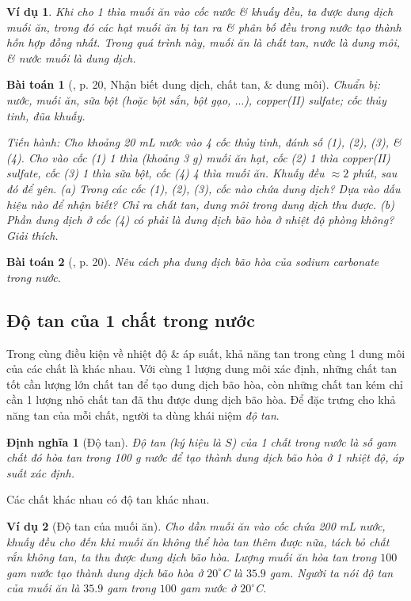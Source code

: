 \documentclass{article}
\newtheorem{baitoan}{Bài toán}
\newtheorem{dinhnghia}{Định nghĩa}
\newtheorem{vidu}{Ví dụ}
\begin{document}
\begin{vidu}
	Khi cho 1 thìa muối ăn vào cốc nước \& khuấy đều, ta được dung dịch muối ăn, trong đó các hạt muối ăn bị tan ra \& phân bố đều trong nước tạo thành hỗn hợp đồng nhất. Trong quá trình này, muối ăn là \emph{chất tan}, nước là \emph{dung môi}, \& nước muối là \emph{dung dịch}.
\end{vidu}

\begin{baitoan}[\cite{SGK_KHTN_8_KNTTVCS}, p. 20, Nhận biết dung dịch, chất tan, \& dung môi]
	\emph{Chuẩn bị:} nước, muối ăn, sữa bột (hoặc bột sắn, bột gạo, $\ldots$), copper(II) sulfate; cốc thủy tinh, đũa khuấy.
	
	\emph{Tiến hành:} Cho khoảng \emph{20 mL} nước vào 4 cốc thủy tinh, đánh số (1), (2), (3), \& (4). Cho vào cốc (1) 1 thìa (khoảng \emph{3 g}) muối ăn hạt, cốc (2) 1 thìa copper(II) sulfate, cốc (3) 1 thìa sữa bột, cốc (4) 4 thìa muối ăn. Khuấy đều $\approx2$ phút, sau đó để yên. (a) Trong các cốc (1), (2), (3), cốc nào chứa dung dịch? Dựa vào dấu hiệu nào để nhận biết? Chỉ ra chất tan, dung môi trong dung dịch thu được. (b) Phần dung dịch ở cốc (4) có phải là dung dịch bão hòa ở nhiệt độ phòng không? Giải thích.
\end{baitoan}

\begin{baitoan}[\cite{SGK_KHTN_8_KNTTVCS}, p. 20]
	Nêu cách pha dung dịch bão hòa của sodium carbonate \emph{} trong nước.
\end{baitoan}

\subsection{Độ tan của 1 chất trong nước}
Trong cùng điều kiện về nhiệt độ \& áp suất, khả năng tan trong cùng 1 dung môi của các chất là khác nhau. Với cùng 1 lượng dung môi xác định, những chất tan tốt cần lượng lớn chất tan để tạo dung dịch bão hòa, còn những chất tan kém chỉ cần 1 lượng nhỏ chất tan đã thu được dung dịch bão hòa. Để đặc trưng cho khả năng tan của mỗi chất, người ta dùng khái niệm \textit{độ tan}.

\begin{dinhnghia}[Độ tan]
	\emph{Độ tan} (ký hiệu là $S$) của 1 chất trong nước là số gam chất đó hòa tan trong \emph{100 g} nước để tạo thành dung dịch bão hòa ở 1 nhiệt độ, áp suất xác định.
\end{dinhnghia}
Các chất khác nhau có độ tan khác nhau.

\begin{vidu}[Độ tan của muối ăn]
	Cho dần muối ăn vào cốc chứa 200 mL nước, khuấy đều cho đến khi muối ăn không thể hòa tan thêm được nữa, tách bỏ chất rắn không tan, ta thu được dung dịch bão hòa. Lượng muối ăn hòa tan trong $100$ gam nước tạo thành dung dịch bão hòa ở $20^\circ$\emph{C} là $35.9$ gam. Người ta nói \emph{độ tan của muối ăn} là $35.9$ gam trong $100$ gam nước ở $20^\circ$\emph{C}.
\end{vidu}
\end{document}
